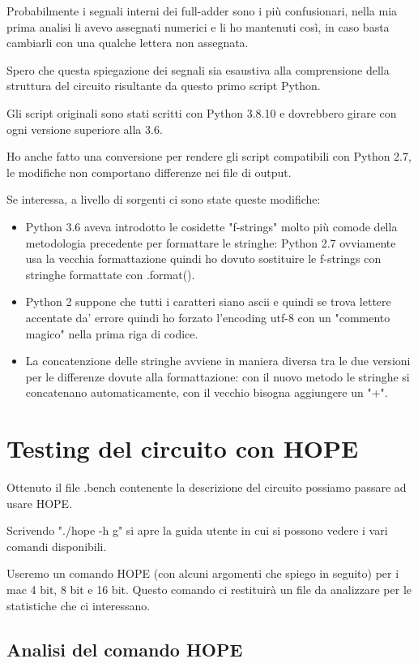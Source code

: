\documentclass[12pt, letterpaper]{article}
\begin{document}
Probabilmente i segnali interni dei full-adder sono i più confusionari, nella mia prima analisi li avevo assegnati numerici e li ho mantenuti così, in caso basta cambiarli con una qualche lettera non assegnata.

Spero che questa spiegazione dei segnali sia esaustiva alla comprensione della struttura del circuito risultante da questo primo script Python.

Gli script originali sono stati scritti con Python 3.8.10 e dovrebbero girare con ogni versione superiore alla 3.6.

Ho anche fatto una conversione per rendere gli script compatibili con Python 2.7, le modifiche non comportano differenze nei file di output.

Se interessa, a livello di sorgenti ci sono state queste modifiche:
\begin{itemize}
\item Python 3.6 aveva introdotto le cosidette "f-strings" molto più comode della metodologia precedente per formattare le stringhe: Python 2.7 ovviamente usa la vecchia formattazione quindi ho dovuto sostituire le f-strings con stringhe formattate con .format().
\item Python 2 suppone che tutti i caratteri siano ascii e quindi se trova lettere accentate da' errore quindi ho forzato l'encoding utf-8 con un "commento magico" nella prima riga di codice.
\item La concatenzione delle stringhe avviene in maniera diversa tra le due versioni per le differenze dovute alla formattazione: con il nuovo metodo le stringhe si concatenano automaticamente, con il vecchio bisogna aggiungere un "+".
\end{itemize}

\section{Testing del circuito con HOPE}

Ottenuto il file .bench contenente la descrizione del circuito possiamo passare ad usare HOPE.

Scrivendo "./hope -h g" si apre la guida utente in cui si possono vedere i vari comandi disponibili.

Useremo un comando HOPE (con alcuni argomenti che spiego in seguito) per i mac 4 bit, 8 bit e 16 bit.
Questo comando ci restituirà un file da analizzare per le statistiche che ci interessano.

\subsection{Analisi del comando HOPE}
\end{document}
